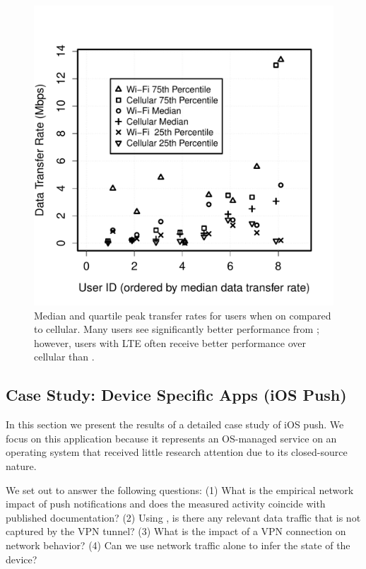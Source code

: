 \begin{figure}
\centering
        \includegraphics[width=\linewidth]{./plots/dataRate.pdf}
  \caption{Median and quartile peak transfer rates for users when on \wifi 
  compared to cellular. Many users see significantly better performance 
  from \wifi; however, users with LTE often receive better performance over 
  cellular than \wifi.}
  \label{fig:datarates}
\end{figure}

\subsection{Case Study: Device Specific Apps (iOS Push)}
\label{sec:case-study-ios}

In this section we present the results of a detailed case study 
of iOS push. We focus on this application because it represents 
an OS-managed service on an operating system that received 
little research attention due to its closed-source nature. 

We set out to answer the following questions: (1) What is the 
empirical network impact of push notifications and does the 
measured activity coincide with published documentation?
(2) Using \meddle, is there any relevant data traffic that is 
not captured by the VPN tunnel? (3) What is the impact of 
a VPN connection on network behavior? (4) Can we use 
network traffic alone to infer the state of the device?

